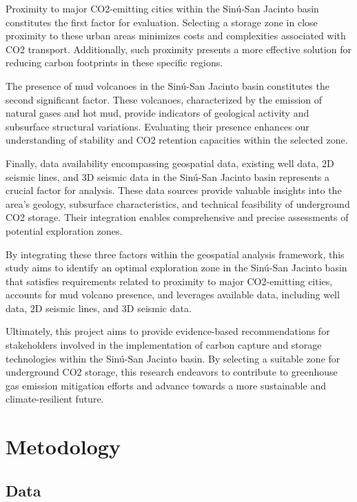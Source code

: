 \documentclass{ifacconf}
\begin{document}
Proximity to major CO2-emitting cities within the Sinú-San Jacinto basin constitutes the first factor for evaluation. Selecting a storage zone in close proximity to these urban areas minimizes costs and complexities associated with CO2 transport. Additionally, such proximity presents a more effective solution for reducing carbon footprints in these specific regions\cite{Ajayi2019}.

The presence of mud volcanoes in the Sinú-San Jacinto basin constitutes the second significant factor. These volcanoes, characterized by the emission of natural gases and hot mud, provide indicators of geological activity and subsurface structural variations. Evaluating their presence enhances our understanding of stability and CO2 retention capacities within the selected zone.

Finally, data availability encompassing geospatial data, existing well data, 2D seismic lines, and 3D seismic data in the Sinú-San Jacinto basin represents a crucial factor for analysis. These data sources provide valuable insights into the area's geology, subsurface characteristics, and technical feasibility of underground CO2 storage. Their integration enables comprehensive and precise assessments of potential exploration zones.

By integrating these three factors within the geospatial analysis framework, this study aims to identify an optimal exploration zone in the Sinú-San Jacinto basin that satisfies requirements related to proximity to major CO2-emitting cities, accounts for mud volcano presence, and leverages available data, including well data, 2D seismic lines, and 3D seismic data.

Ultimately, this project aims to provide evidence-based recommendations for stakeholders involved in the implementation of carbon capture and storage technologies within the Sinú-San Jacinto basin. By selecting a suitable zone for underground CO2 storage, this research endeavors to contribute to greenhouse gas emission mitigation efforts and advance towards a more sustainable and climate-resilient future.


\section{Metodology}



\subsection{Data}
\end{document}
